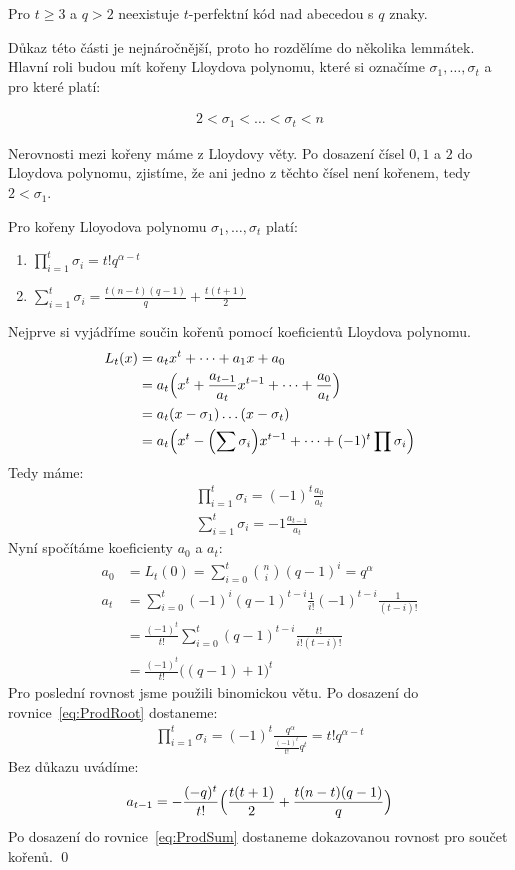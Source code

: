 \vt Pro $t \geq 3$ a $q > 2$ neexistuje $t$-perfektní kód nad abecedou s $q$ znaky.

Důkaz této části je nejnáročnější, proto ho rozdělíme do několika lemmátek. Hlavní roli budou mít kořeny Lloydova polynomu, které si označíme $\sigma_1, \dots, \sigma_t$ a pro které platí:

\begin{align*}
2 < \sigma_1 < \dots < \sigma_t < n
\end{align*}

Nerovnosti mezi kořeny máme z Lloydovy věty. Po dosazení čísel $0, 1$ a $2$ do Lloydova polynomu, zjistíme, že ani jedno z těchto čísel není kořenem, tedy $2 < \sigma_1$.

\lm Pro kořeny Lloyodova polynomu $\sigma_1, \dots, \sigma_t$ platí:
\begin{enumerate}
\item $\prod\limits_{i = 1}^{t} \sigma_i = t!q^{\alpha - t}$
\item $\sum\limits_{i = 1}^{t} \sigma_i = \frac{t(n-t)(q-1)}{q} + \frac{t(t+1)}{2}$
\end{enumerate}


\dk Nejprve si vyjádříme součin kořenů pomocí koeficientů Lloydova polynomu.
\begin{align*}
L_t(x) &= a_t x^t + \dots + a_1x + a_0 \\
&= a_t \Bigl(x^t + \frac{a_{t-1}}{a_t}x^{t-1} + \dots + \frac{a_0}{a_t}\Bigr) \\
&= a_t (x - \sigma_1)\dots(x - \sigma_t) \\
&= a_t\Bigl(x^t - \Bigl(\sum \sigma_i\Bigr)x^{t-1} + \dots + (-1)^t \prod \sigma_i\Bigr)
\end{align*}
Tedy máme:
\begin{align}
\prod\limits_{i = 1}^{t} \sigma_i = (-1)^t \frac{a_0}{a_t} \label{eq:ProdRoot} \\
\sum\limits_{i = 1}^{t} \sigma_i = -1 \frac{a_{t-1}}{a_t} \label{eq:ProdSum}
\end{align}
Nyní spočítáme koeficienty $a_0$ a $a_t$:
\begin{align*}
a_0 &= L_t(0) = \sum\limits_{i = 0}^{t} {n \choose i}(q - 1)^i = q^\alpha \\
a_t &= \sum\limits_{i = 0}^{t} (-1)^i (q - 1)^{t - i} \frac{1}{i!}(-1)^{t-i} \frac{1}{(t-i)!} \\
&= \frac{(-1)^t}{t!}\sum\limits_{i = 0}^{t}(q-1)^{t-i} \frac{t!}{i!(t-i)!} \\
&= \frac{(-1)^t}{t!}\bigl((q - 1) + 1\bigr)^t
\end{align*}
Pro poslední rovnost jsme použili binomickou větu. Po dosazení do rovnice~\ref{eq:ProdRoot} dostaneme:
\begin{align*}
\prod\limits_{i = 1}^{t} \sigma_i = (-1)^t \frac{q^\alpha}{\frac{(-1)^t}{t!}q^t} = t!q^{\alpha-t}
\end{align*}
Bez důkazu uvádíme:
\begin{align*}
a_{t-1} = - \frac{(-q)^t}{t!}\Bigl(\frac{t(t+1)}{2} + \frac{t(n-t)(q - 1)}{q}\Bigr) 
\end{align*}
Po dosazení do rovnice~\ref{eq:ProdSum} dostaneme dokazovanou rovnost pro součet kořenů.
\qed

